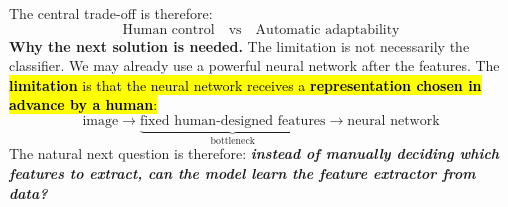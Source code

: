 The central trade-off is therefore:
\begin{equation*}
    \text{Human control} \quad \text{vs} \quad \text{Automatic adaptability}
\end{equation*}
\textcolor{Green3}{ \textbf{Why the next solution is needed.}} The limitation is not necessarily the classifier. We may already use a powerful neural network after the features. The \hl{\textbf{limitation} is that the neural network receives a \textbf{representation chosen in advance by a human}:}
\begin{equation*}
    \text{image} \to \underbrace{\text{fixed human-designed features}}_{\text{bottleneck}} \to \text{neural network}
\end{equation*}
The natural next question is therefore: \emph{\textbf{instead of manually deciding which features to extract, can the model learn the feature extractor from data?}}
